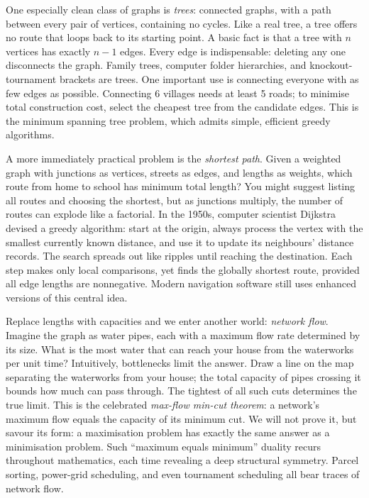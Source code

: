 One especially clean class of graphs is \emph{trees}: connected graphs, with a path between every pair of vertices, containing no cycles. Like a real tree, a tree offers no route that loops back to its starting point. A basic fact is that a tree with $n$ vertices has exactly $n-1$ edges. Every edge is indispensable: deleting any one disconnects the graph. Family trees, computer folder hierarchies, and knockout-tournament brackets are trees. One important use is connecting everyone with as few edges as possible. Connecting 6 villages needs at least 5 roads; to minimise total construction cost, select the cheapest tree from the candidate edges. This is the minimum spanning tree problem, which admits simple, efficient greedy algorithms.

A more immediately practical problem is the \emph{shortest path}. Given a weighted graph with junctions as vertices, streets as edges, and lengths as weights, which route from home to school has minimum total length? You might suggest listing all routes and choosing the shortest, but as junctions multiply, the number of routes can explode like a factorial. In the 1950s, computer scientist Dijkstra devised a greedy algorithm: start at the origin, always process the vertex with the smallest currently known distance, and use it to update its neighbours' distance records. The search spreads out like ripples until reaching the destination. Each step makes only local comparisons, yet finds the globally shortest route, provided all edge lengths are nonnegative. Modern navigation software still uses enhanced versions of this central idea.

Replace lengths with capacities and we enter another world: \emph{network flow}. Imagine the graph as water pipes, each with a maximum flow rate determined by its size. What is the most water that can reach your house from the waterworks per unit time? Intuitively, bottlenecks limit the answer. Draw a line on the map separating the waterworks from your house; the total capacity of pipes crossing it bounds how much can pass through. The tightest of all such cuts determines the true limit. This is the celebrated \emph{max-flow min-cut theorem}: a network's maximum flow equals the capacity of its minimum cut. We will not prove it, but savour its form: a maximisation problem has exactly the same answer as a minimisation problem. Such ``maximum equals minimum'' duality recurs throughout mathematics, each time revealing a deep structural symmetry. Parcel sorting, power-grid scheduling, and even tournament scheduling all bear traces of network flow.

